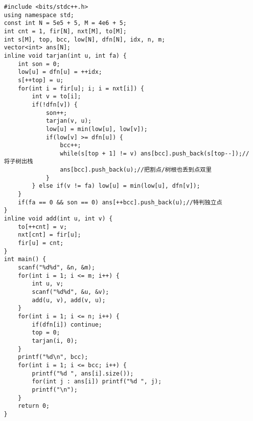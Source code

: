 \documentclass[]{article}
\begin{document}
\begin{verbatim}
#include <bits/stdc++.h>
using namespace std;
const int N = 5e5 + 5, M = 4e6 + 5;
int cnt = 1, fir[N], nxt[M], to[M];
int s[M], top, bcc, low[N], dfn[N], idx, n, m;
vector<int> ans[N];
inline void tarjan(int u, int fa) {
    int son = 0;
    low[u] = dfn[u] = ++idx;
    s[++top] = u;
    for(int i = fir[u]; i; i = nxt[i]) {
        int v = to[i];
        if(!dfn[v]) {
            son++;
            tarjan(v, u);
            low[u] = min(low[u], low[v]);
            if(low[v] >= dfn[u]) {
                bcc++;
                while(s[top + 1] != v) ans[bcc].push_back(s[top--]);//将子树出栈
                ans[bcc].push_back(u);//把割点/树根也丢到点双里
            }
        } else if(v != fa) low[u] = min(low[u], dfn[v]);
    }
    if(fa == 0 && son == 0) ans[++bcc].push_back(u);//特判独立点
}
inline void add(int u, int v) {
    to[++cnt] = v;
    nxt[cnt] = fir[u];
    fir[u] = cnt;
}
int main() {
    scanf("%d%d", &n, &m);
    for(int i = 1; i <= m; i++) {
        int u, v;
        scanf("%d%d", &u, &v);
        add(u, v), add(v, u);
    }
    for(int i = 1; i <= n; i++) {
        if(dfn[i]) continue;
        top = 0;
        tarjan(i, 0);
    }
    printf("%d\n", bcc);
    for(int i = 1; i <= bcc; i++) {
        printf("%d ", ans[i].size());
        for(int j : ans[i]) printf("%d ", j);
        printf("\n");
    }
    return 0;
}
\end{verbatim}
\end{document}
